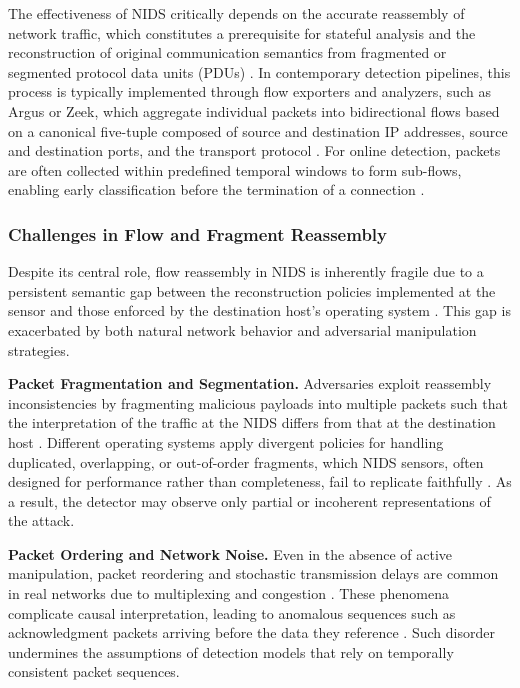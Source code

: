 The effectiveness of NIDS critically depends on the accurate reassembly of network traffic, which constitutes a prerequisite for stateful analysis and the reconstruction of original communication semantics from fragmented or segmented protocol data units (PDUs) \cite{corona2013adversarial}. 
In contemporary detection pipelines, this process is typically implemented through flow exporters and analyzers, such as Argus or Zeek, which aggregate individual packets into bidirectional flows based on a canonical five-tuple composed of source and destination IP addresses, source and destination ports, and the transport protocol \cite{debicha2023adv}. 
For online detection, packets are often collected within predefined temporal windows to form sub-flows, enabling early classification before the termination of a connection \cite{doriguzzi2020lucid}.

\subsubsection*{Challenges in Flow and Fragment Reassembly}

Despite its central role, flow reassembly in NIDS is inherently fragile due to a persistent semantic gap between the reconstruction policies implemented at the sensor and those enforced by the destination host’s operating system \cite{corona2013adversarial}. 
This gap is exacerbated by both natural network behavior and adversarial manipulation strategies.

\textbf{Packet Fragmentation and Segmentation.}  
Adversaries exploit reassembly inconsistencies by fragmenting malicious payloads into multiple packets such that the interpretation of the traffic at the NIDS differs from that at the destination host \cite{bittau2005fragmentation}. 
Different operating systems apply divergent policies for handling duplicated, overlapping, or out-of-order fragments, which NIDS sensors, often designed for performance rather than completeness, fail to replicate faithfully \cite{md2025guardians}. 
As a result, the detector may observe only partial or incoherent representations of the attack.

\textbf{Packet Ordering and Network Noise.}  
Even in the absence of active manipulation, packet reordering and stochastic transmission delays are common in real networks due to multiplexing and congestion \cite{han2021evaluating}. 
These phenomena complicate causal interpretation, leading to anomalous sequences such as acknowledgment packets arriving before the data they reference \cite{ennaji2025adversarial}. 
Such disorder undermines the assumptions of detection models that rely on temporally consistent packet sequences.

